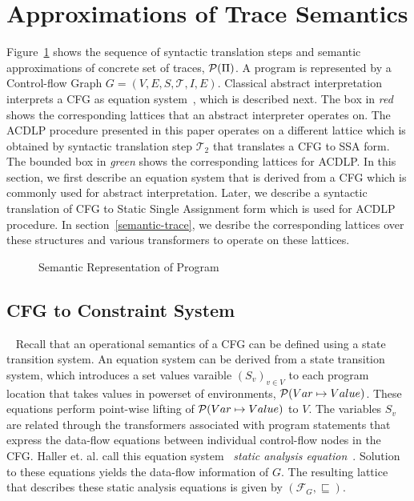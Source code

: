 {\section{Approximations of Trace Semantics}
%
Figure~\ref{fig:semantic} shows the sequence of syntactic translation steps 
and semantic approximations of concrete set of traces, $\mathcal{P}(\Pi)$.  
A program is represented by a Control-flow Graph $G=(V,E,S,\mathcal{T},I,E)$.  
Classical abstract interpretation interprets a CFG as equation 
system~\cite{minethesis,Schmidt98,tacas12}, which is described next.  The box in 
\emph{red} shows the corresponding lattices that an abstract interpreter
operates on.  The ACDLP procedure presented in this paper operates on a
different lattice which is obtained by syntactic translation step
$\mathcal{T}_2$ that translates a CFG to SSA form. The bounded box in 
\emph{green} shows the corresponding lattices for ACDLP. In this section, 
we first describe an equation system that is derived from a CFG which is commonly
used for abstract interpretation.  Later, we describe a syntactic translation 
of CFG to Static Single Assignment form which is used for ACDLP procedure.   
In section~\ref{semantic-trace}, we desribe the corresponding lattices over 
these structures and various transformers to operate on these lattices. 
%
\begin{figure}[htbp]
\centering
{}
\caption{Semantic Representation of Program \label{fig:semantic}}
\end{figure}
%
%
\subsection{CFG to Constraint System}~\label{ssa-cite}
%
Recall that an operational semantics of a CFG can be defined using a 
state transition system. An equation 
system can be derived from a state transition system, which introduces a set
values varaible $(S_v)_{v \in V}$ to each program location that takes values in
powerset of environments, $\mathcal{P}(Var \mapsto Value)$.  These equations perform 
point-wise lifting of $\mathcal{P}(Var \mapsto Value)$ to $V$.   The variables $S_v$
are related through the transformers associated with program statements that express the 
data-flow equations between individual control-flow nodes in the CFG.  Haller
et. al. call this equation system~\cite{minethesis} 
\emph{static analysis equation}~\cite{tacas12}.  Solution to these equations 
yields the data-flow information of $G$.  The resulting lattice that describes 
these static analysis equations is given by $(\mathcal{F}_G, \sqsubseteq)$.   
%


}
